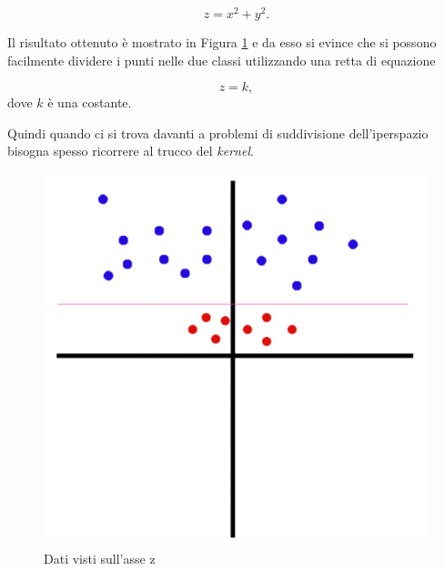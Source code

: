 \documentclass[12pt,italian]{report}
\begin{document}
\[ z = x^2 + y^2.\]

Il risultato ottenuto è mostrato in Figura \ref{fig:svc_on_z_axis} e da esso si evince che si possono facilmente dividere i punti nelle due classi utilizzando una retta di equazione

\[ z = k ,\]
dove $k$ è una costante.

Quindi quando ci si trova davanti a problemi di suddivisione dell'iperspazio bisogna spesso ricorrere al trucco del \emph{kernel}. 

\begin{figure}[h!]
	\center
	\includegraphics[scale=0.4]{../img/svc_on_z_axis} %
	\caption{Dati visti sull'asse z}
	\label{fig:svc_on_z_axis}
\end{figure}

	
\end{document}

